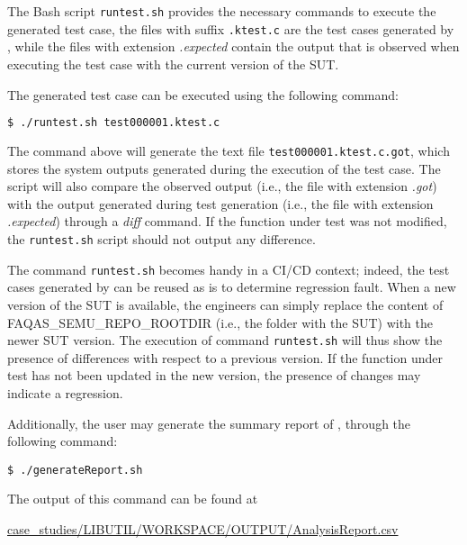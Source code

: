 The Bash script \texttt{runtest.sh} provides the necessary commands to execute the generated test case, the files with suffix \texttt{.ktest.c}  are the test cases generated by \SEMUS, while the files with extension \emph{.expected} contain the output that is observed when executing the test case with the current version of the SUT.

The generated test case can be executed using the following command:

\begin{lstlisting}[language=bash]
 $ ./runtest.sh test000001.ktest.c
\end{lstlisting}

The command above will generate the text file \texttt{test000001.ktest.c.got}, which stores the system outputs generated during the execution of the test case. The script will also compare the observed output (i.e., the file with extension \emph{.got}) with the output generated during test generation (i.e., the file with extension \emph{.expected}) through a \emph{diff} command. If the function under test was not modified, the \texttt{runtest.sh} script should not output any difference. 


The command \texttt{runtest.sh} becomes handy in a CI/CD context; indeed, the test cases generated by \SEMUS can be reused as is to determine regression fault. When a new version of the SUT is available, the engineers can simply replace the content of FAQAS\_SEMU\_REPO\_ROOTDIR (i.e., the folder with the SUT) with the newer SUT version. The execution of command \texttt{runtest.sh} will thus show the presence of differences with respect to a previous version. If the function under test has not been updated in the new version, the presence of changes may indicate a regression.

Additionally, the user may generate the summary report of \SEMUS, through the following command:

\begin{lstlisting}[language={}, label=listing:semus_results]
 $ ./generateReport.sh
\end{lstlisting}


The output of this command can be found at \begin{scriptsize}\url{case_studies/LIBUTIL/WORKSPACE/OUTPUT/AnalysisReport.csv}\end{scriptsize}